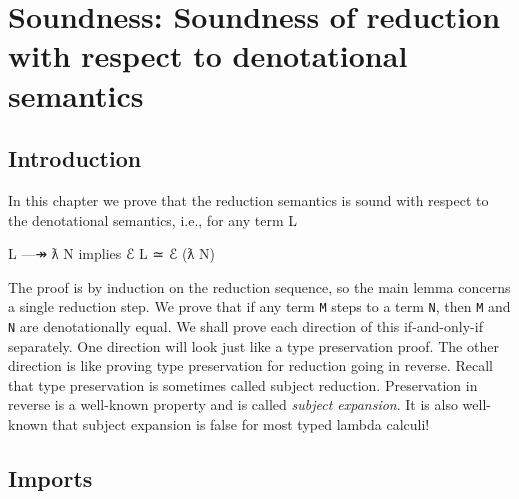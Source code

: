 \hypertarget{Soundness}{%
\chapter{Soundness: Soundness of reduction with respect to denotational
semantics}\label{Soundness}}

\begin{fence}
\begin{code}%
\>[0]\AgdaSpace{}%
\AgdaSpace{}%
\<%
\end{code}
\end{fence}

\hypertarget{introduction}{%
\section{Introduction}\label{introduction}}

In this chapter we prove that the reduction semantics is sound with
respect to the denotational semantics, i.e., for any term L

\begin{myDisplay}
L —↠ ƛ N  implies  ℰ L ≃ ℰ (ƛ N)
\end{myDisplay}

The proof is by induction on the reduction sequence, so the main lemma
concerns a single reduction step. We prove that if any term \texttt{M}
steps to a term \texttt{N}, then \texttt{M} and \texttt{N} are
denotationally equal. We shall prove each direction of this
if-and-only-if separately. One direction will look just like a type
preservation proof. The other direction is like proving type
preservation for reduction going in reverse. Recall that type
preservation is sometimes called subject reduction. Preservation in
reverse is a well-known property and is called \emph{subject expansion}.
It is also well-known that subject expansion is false for most typed
lambda calculi!

\hypertarget{imports}{%
\section{Imports}\label{imports}}

